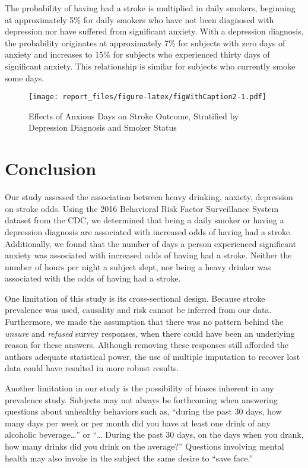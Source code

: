 \documentclass[11pt,]{article}
\begin{document}
The probability of having had a stroke is multiplied in daily smokers,
beginning at approximately 5\% for daily smokers who have not been
diagnosed with depression nor have suffered from significant anxiety.
With a depression diagnosis, the probability originates at approximately
7\% for subjects with zero days of anxiety and increases to 15\% for
subjects who experienced thirty days of significant anxiety. This
relationship is similar for subjects who currently smoke some days.

\begin{figure}
\centering
\texttt{[image: report\_files/figure-latex/figWithCaption2-1.pdf]}
\caption{Effects of Anxious Days on Stroke Outcome, Stratified by
Depression Diagnosis and Smoker Status}
\end{figure}

\section{Conclusion}\label{conclusion}

Our study assessed the association between heavy drinking, anxiety,
depression on stroke odds. Using the 2016 Behavioral Risk Factor
Surveillance System dataset from the CDC, we determined that being a
daily smoker or having a depression diagnosis are associated with
increased odds of having had a stroke. Additionally, we found that the
number of days a person experienced significant anxiety was associated
with increased odds of having had a stroke. Neither the number of hours
per night a subject slept, nor being a heavy drinker was associated with
the odds of having had a stroke.

One limitation of this study is its cross-sectional design. Because
stroke prevalence was used, causality and risk cannot be inferred from
our data. Furthermore, we made the assumption that there was no pattern
behind the \emph{unsure} and \emph{refused} survey responses, when there
could have been an underlying reason for these answers. Although
removing these responses still afforded the authors adequate statistical
power, the use of multiple imputation to recover lost data could have
resulted in more robust results.

Another limitation in our study is the possibility of biases inherent in
any prevalence study. Subjects may not always be forthcoming when
answering questions about unhealthy behaviors such as, ``during the past
30 days, how many days per week or per month did you have at least one
drink of any alcoholic beverage\ldots{}'' or ``\ldots{} During the past
30 days, on the days when you drank, how many drinks did you drink on
the average?'' Questions involving mental health may also invoke in the
subject the same desire to ``save face.''
\end{document}
